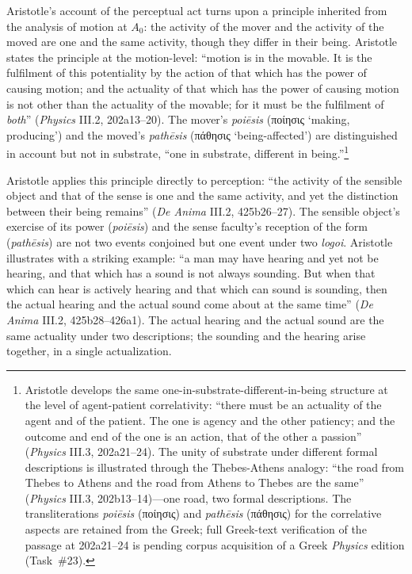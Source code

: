 \documentclass{article}
\newcommand{\gk}[1]{{\greekfont #1}}
\begin{document}
Aristotle's account of the perceptual act turns upon a principle inherited from the analysis of motion at $A_0$: the activity of the mover and the activity of the moved are one and the same activity, though they differ in their being. Aristotle states the principle at the motion-level: ``motion is in the movable. It is the fulfilment of this potentiality by the action of that which has the power of causing motion; and the actuality of that which has the power of causing motion is not other than the actuality of the movable; for it must be the fulfilment of \textit{both}'' (\textit{Physics} III.2, 202a13--20). The mover's \textit{poiēsis} (\gk{ποίησις} `making, producing') and the moved's \textit{pathēsis} (\gk{πάθησις} `being-affected') are distinguished in account but not in substrate, ``one in substrate, different in being.''\footnote{Aristotle develops the same one-in-substrate-different-in-being structure at the level of agent-patient correlativity: ``there must be an actuality of the agent and of the patient. The one is agency and the other patiency; and the outcome and end of the one is an action, that of the other a passion'' (\textit{Physics} III.3, 202a21--24). The unity of substrate under different formal descriptions is illustrated through the Thebes-Athens analogy: ``the road from Thebes to Athens and the road from Athens to Thebes are the same'' (\textit{Physics} III.3, 202b13--14)---one road, two formal descriptions. The transliterations \textit{poiēsis} (\gk{ποίησις}) and \textit{pathēsis} (\gk{πάθησις}) for the correlative aspects are retained from the Greek; full Greek-text verification of the passage at 202a21--24 is pending corpus acquisition of a Greek \textit{Physics} edition (Task~\#23).}

Aristotle applies this principle directly to perception: ``the activity of the sensible object and that of the sense is one and the same activity, and yet the distinction between their being remains'' (\textit{De Anima} III.2, 425b26--27). The sensible object's exercise of its power (\textit{poiēsis}) and the sense faculty's reception of the form (\textit{pathēsis}) are not two events conjoined but one event under two \textit{logoi}. Aristotle illustrates with a striking example: ``a man may have hearing and yet not be hearing, and that which has a sound is not always sounding. But when that which can hear is actively hearing and that which can sound is sounding, then the actual hearing and the actual sound come about at the same time'' (\textit{De Anima} III.2, 425b28--426a1). The actual hearing and the actual sound are the same actuality under two descriptions; the sounding and the hearing arise together, in a single actualization.
\end{document}
